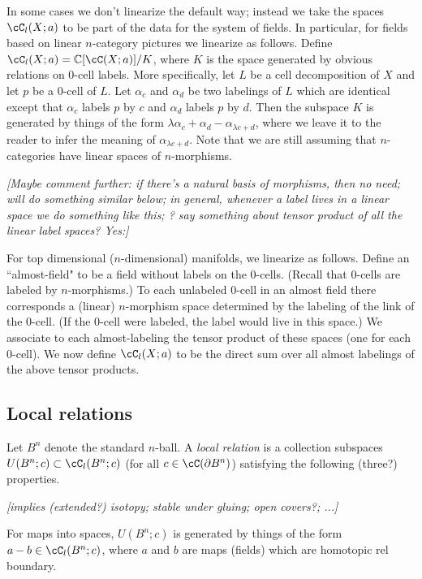 \documentclass[11pt,leqno]{article}
\def\c{\mathbb{C}}
\def\bd{\partial}
\def\sub{\subset}
\def\nn#1{{{\it \small [#1]}}}
\begin{document}
In some cases we don't linearize the default way; instead we take the
spaces $\cC_l(X; a)$ to be part of the data for the system of fields.
In particular, for fields based on linear $n$-category pictures we linearize as follows.
Define $\cC_l(X; a) = \c[\cC(X; a)]/K$, where $K$ is the space generated by 
obvious relations on 0-cell labels.
More specifically, let $L$ be a cell decomposition of $X$ 
and let $p$ be a 0-cell of $L$.
Let $\alpha_c$ and $\alpha_d$ be two labelings of $L$ which are identical except that
$\alpha_c$ labels $p$ by $c$ and $\alpha_d$ labels $p$ by $d$.
Then the subspace $K$ is generated by things of the form
$\lambda \alpha_c + \alpha_d - \alpha_{\lambda c + d}$, where we leave it to the reader
to infer the meaning of $\alpha_{\lambda c + d}$.
Note that we are still assuming that $n$-categories have linear spaces of $n$-morphisms.

\nn{Maybe comment further: if there's a natural basis of morphisms, then no need; 
will do something similar below; in general, whenever a label lives in a linear
space we do something like this; ? say something about tensor 
product of all the linear label spaces?  Yes:}

For top dimensional ($n$-dimensional) manifolds, we linearize as follows.
Define an ``almost-field" to be a field without labels on the 0-cells.
(Recall that 0-cells are labeled by $n$-morphisms.)
To each unlabeled 0-cell in an almost field there corresponds a (linear) $n$-morphism
space determined by the labeling of the link of the 0-cell.
(If the 0-cell were labeled, the label would live in this space.)
We associate to each almost-labeling the tensor product of these spaces (one for each 0-cell).
We now define $\cC_l(X; a)$ to be the direct sum over all almost labelings of the 
above tensor products.



\subsection{Local relations}

Let $B^n$ denote the standard $n$-ball.
A {\it local relation} is a collection subspaces $U(B^n; c) \sub \cC_l(B^n; c)$ 
(for all $c \in \cC(\bd B^n)$) satisfying the following (three?) properties.

\nn{implies (extended?) isotopy; stable under gluing; open covers?; ...}

For maps into spaces, $U(B^n; c)$ is generated by things of the form $a-b \in \cC_l(B^n; c)$,
where $a$ and $b$ are maps (fields) which are homotopic rel boundary.
\end{document}
